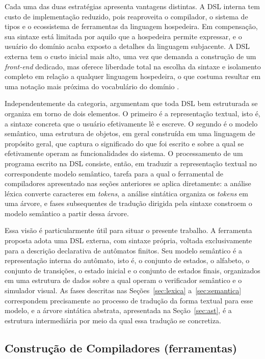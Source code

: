 \documentclass[
    12pt
    ,oneside
    ,a4paper
    ,chapter=TITLE
    ,section=TITLE
    ,sumario=abnt-6027-2012]{abntex2}
\begin{document}
Cada uma das duas estratégias apresenta vantagens distintas. A DSL interna tem custo de
implementação reduzido, pois reaproveita o compilador, o sistema de tipos e o ecossistema de
ferramentas da linguagem hospedeira. Em compensação, sua sintaxe está limitada por aquilo que a
hospedeira permite expressar, e o usuário do domínio acaba exposto a detalhes da linguagem
subjacente. A DSL externa tem o custo inicial mais alto, uma vez que demanda a construção de um
\textit{front-end} dedicado, mas oferece liberdade total na escolha da sintaxe e isolamento
completo em relação a qualquer linguagem hospedeira, o que costuma resultar em uma notação mais
próxima do vocabulário do domínio \cite{fowler2010}.

Independentemente da categoria,  argumentam que toda DSL bem estruturada
se organiza em torno de dois elementos. O primeiro é a representação textual, isto é, a
sintaxe concreta que o usuário efetivamente lê e escreve. O segundo é o modelo semântico,
uma estrutura de objetos, em geral construída em uma linguagem de propósito geral, que captura
o significado do que foi escrito e sobre a qual se efetivamente operam as funcionalidades do
sistema. O processamento de um programa escrito na DSL consiste, então, em traduzir a
representação textual no correspondente modelo semântico, tarefa para a qual o ferramental de
compiladores apresentado nas seções anteriores se aplica diretamente: a análise léxica converte
caracteres em \textit{tokens}, a análise sintática organiza os \textit{tokens} em uma árvore, e
fases subsequentes de tradução dirigida pela sintaxe constroem o modelo semântico a partir dessa
árvore.

Essa visão é particularmente útil para situar o presente trabalho. A ferramenta proposta adota
uma DSL externa, com sintaxe própria, voltada exclusivamente para a descrição declarativa de
autômatos finitos. Seu modelo semântico é a representação interna do autômato, isto é, o conjunto
de estados, o alfabeto, o conjunto de transições, o estado inicial e o conjunto de estados
finais, organizados em uma estrutura de dados sobre a qual operam o verificador semântico e o
simulador visual. As fases descritas nas Seções~\ref{sec:lexica} a~\ref{sec:semantica}
correspondem precisamente ao processo de tradução da forma textual para esse modelo, e a árvore
sintática abstrata, apresentada na Seção~\ref{sec:ast}, é a estrutura intermediária por meio da
qual essa tradução se concretiza.

\subsection{Construção de Compiladores (ferramentas)}
\label{sec:contrucao-compiladores}
\end{document}

